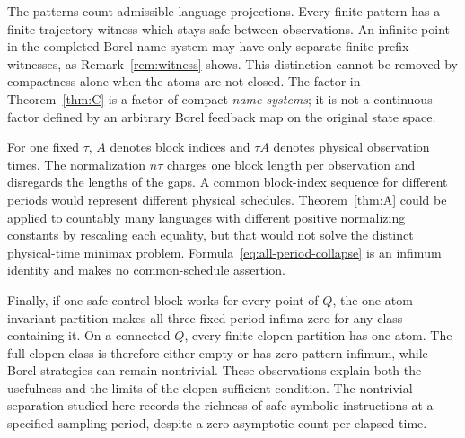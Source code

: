 \documentclass[11pt,reqno]{amsart}
\numberwithin{equation}{section}
\theoremstyle{definition}
\begin{document}
The patterns count admissible language projections. Every finite pattern
has a finite trajectory witness which stays safe between observations.
An infinite point in the completed Borel name system may have only
separate finite-prefix witnesses, as Remark~\ref{rem:witness} shows.
This distinction cannot be removed by compactness alone when the atoms
are not closed. The factor in Theorem~\ref{thm:C} is a factor of compact
\emph{name systems}; it is not a continuous factor defined by an arbitrary
Borel feedback map on the original state space.

For one fixed $\tau$, $A$ denotes block indices and $\tau A$ denotes
physical observation times. The normalization $n\tau$ charges one block
length per observation and disregards the lengths of the gaps. A common
block-index sequence for different periods would represent different
physical schedules. Theorem~\ref{thm:A} could be applied to countably many
languages with different positive normalizing constants by rescaling
each equality, but that would not solve the distinct physical-time
minimax problem. Formula~\eqref{eq:all-period-collapse} is an infimum
identity and makes no common-schedule assertion.

Finally, if one safe control block works for every point of $Q$, the
one-atom invariant partition makes all three fixed-period infima zero
for any class containing it. On a connected $Q$, every finite clopen
partition has one atom. The full clopen class is therefore either empty
or has zero pattern infimum, while Borel strategies can remain
nontrivial. These observations explain both the usefulness and the
limits of the clopen sufficient condition. The nontrivial separation
studied here records the richness of safe symbolic instructions at a
specified sampling period, despite a zero asymptotic count per elapsed
time.
\end{document}
